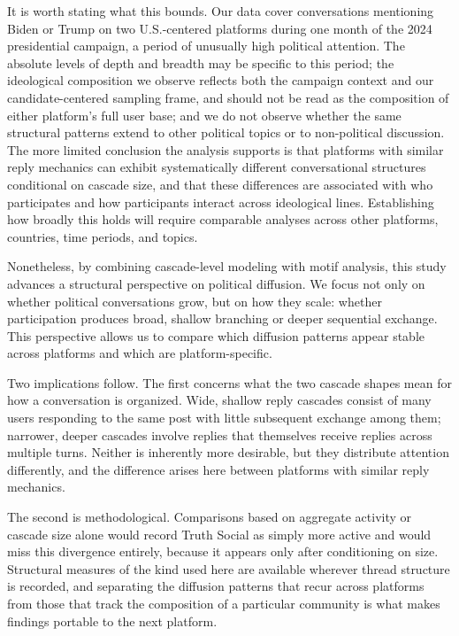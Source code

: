 \documentclass[letterpaper]{article} %
\newcommand{\rev}[1]{{\color{blue}#1}}
\begin{document}
\rev{It is worth stating what this bounds. Our data cover conversations mentioning Biden or Trump on two U.S.-centered platforms during one month of the 2024 presidential campaign, a period of unusually high political attention. The absolute levels of depth and breadth may be specific to this period; the ideological composition we observe reflects both the campaign context and our candidate-centered sampling frame, and should not be read as the composition of either platform's full user base; and we do not observe whether the same structural patterns extend to other political topics or to non-political discussion. The more limited conclusion the analysis supports is that platforms with similar reply mechanics can exhibit systematically different conversational structures conditional on cascade size, and that these differences are associated with who participates and how participants interact across ideological lines. Establishing how broadly this holds will require comparable analyses across other platforms, countries, time periods, and topics.}

Nonetheless, by combining cascade-level modeling with motif analysis, this study advances a structural perspective on political diffusion. We focus not only on whether political conversations grow, but on how they scale: whether participation produces broad, shallow branching or deeper sequential exchange. This perspective allows us to compare which diffusion patterns appear stable across platforms and which are platform-specific.

\rev{Two implications follow. The first concerns what the two cascade shapes mean for how a conversation is organized. Wide, shallow reply cascades consist of many users responding to the same post with little subsequent exchange among them; narrower, deeper cascades involve replies that themselves receive replies across multiple turns. Neither is inherently more desirable, but they distribute attention differently, and the difference arises here between platforms with similar reply mechanics.}

\rev{The second is methodological. Comparisons based on aggregate activity or cascade size alone would record Truth Social as simply more active and would miss this divergence entirely, because it appears only after conditioning on size. Structural measures of the kind used here are available wherever thread structure is recorded, and separating the diffusion patterns that recur across platforms from those that track the composition of a particular community is what makes findings portable to the next platform.} 
\end{document}
